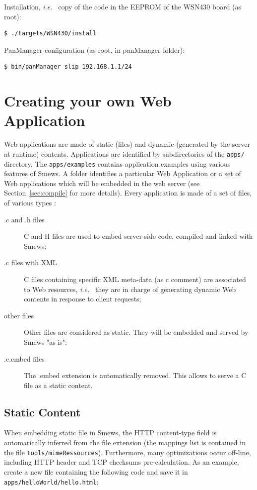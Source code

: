 \documentclass{report}
\newcommand{\ie}{{\it i.e.}~}
\newcommand{\rsec}[1]{Section~\ref{sec:#1}}
\begin{document}
Installation, \ie{} copy of the code in the EEPROM of the WSN430 board (as root):
\begin{verbatim}
$ ./targets/WSN430/install
\end{verbatim}

PanManager configuration (as root, in panManager folder):
\begin{verbatim}
$ bin/panManager slip 192.168.1.1/24
\end{verbatim}

\chapter{Creating your own Web Application}
\label{ch:creatingapp}

Web applications are made of static (files) and dynamic (generated by the server at runtime) contents. Applications are identified by subdirectories of the \texttt{apps/} directory. The \texttt{apps/examples} contains application examples using various features of Smews. A folder identifies a particular Web Application or a set of Web applications which will be embedded in the web server (see \rsec{compile} for more details). Every application is made of a set of files, of various types :
\begin{description}
\item[.c and .h files] C and H files are used to embed server-side code, compiled and linked with Smews;
\item[.c files with XML] C files containing specific XML meta-data (as c comment) are associated to Web resources, \ie{} they are in charge of generating dynamic Web contents in response to client requests;
\item[other files] Other files are considered as static. They will be embedded and served by Smews "as is";
\item[.c.embed files] The .embed extension is automatically removed. This allows to serve a C file as a static content.
\end{description}

\section{Static Content}

When embedding static file in Smews, the HTTP content-type field is automatically inferred from the file extension (the mappings list is contained in the file \texttt{tools/mimeRessources}). Furthermore, many optimizations occur off-line, including HTTP header and TCP checksums pre-calculation. As an example, create a new file containing the following code and save it in \texttt{apps/helloWorld/hello.html}:
\end{document}
